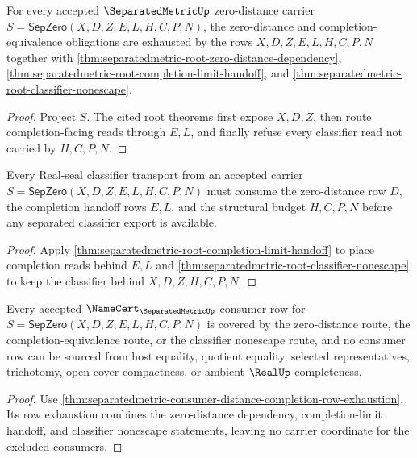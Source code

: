 \begin{theorem}
\label{thm:separatedmetric-consumer-distance-completion-row-exhaustion}
For every accepted $\SeparatedMetricUp$ zero-distance carrier $S=\mathsf{SepZero}(X,D,Z,E,L,H,C,P,N)$, the zero-distance and completion-equivalence obligations are exhausted by the rows $X,D,Z,E,L,H,C,P,N$ together with \autoref{thm:separatedmetric-root-zero-distance-dependency}, \autoref{thm:separatedmetric-root-completion-limit-handoff}, and \autoref{thm:separatedmetric-root-classifier-nonescape}.
\end{theorem}
\begin{proof}
Project $S$. The cited root theorems first expose $X,D,Z$, then route completion-facing reads through $E,L$, and finally refuse every classifier read not carried by $H,C,P,N$.
\end{proof}
\begin{theorem}
\label{thm:separatedmetric-consumer-real-seal-classifier-transport-budget}
Every Real-seal classifier transport from an accepted carrier $S=\mathsf{SepZero}(X,D,Z,E,L,H,C,P,N)$ must consume the zero-distance row $D$, the completion handoff rows $E,L$, and the structural budget $H,C,P,N$ before any separated classifier export is available.
\end{theorem}
\begin{proof}
Apply \autoref{thm:separatedmetric-root-completion-limit-handoff} to place completion reads behind $E,L$ and \autoref{thm:separatedmetric-root-classifier-nonescape} to keep the classifier behind $X,D,Z,H,C,P,N$.
\end{proof}
\begin{theorem}
\label{thm:separatedmetric-consumer-namecert-row-coverage}
Every accepted $\NameCert_{\SeparatedMetricUp}$ consumer row for $S=\mathsf{SepZero}(X,D,Z,E,L,H,C,P,N)$ is covered by the zero-distance route, the completion-equivalence route, or the classifier nonescape route, and no consumer row can be sourced from host equality, quotient equality, selected representatives, trichotomy, open-cover compactness, or ambient $\RealUp$ completeness.
\end{theorem}
\begin{proof}
Use \autoref{thm:separatedmetric-consumer-distance-completion-row-exhaustion}. Its row exhaustion combines the zero-distance dependency, completion-limit handoff, and classifier nonescape statements, leaving no carrier coordinate for the excluded consumers.
\end{proof}
